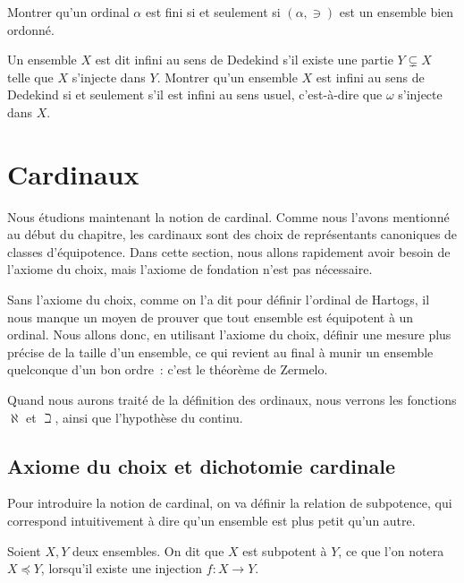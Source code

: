 \begin{exercise}
  Montrer qu'un ordinal $\alpha$ est fini si et seulement si $(\alpha,\ni)$ est
  un ensemble bien ordonné.
\end{exercise}

\begin{exercise}
  Un ensemble $X$ est dit infini au sens de Dedekind s'il existe une partie
  $Y\subsetneq X$ telle que $X$ s'injecte dans $Y$. Montrer qu'un ensemble $X$
  est infini au sens de Dedekind si et seulement s'il est infini au sens usuel,
  c'est-à-dire que $\omega$ s'injecte dans $X$.
\end{exercise}

\section{Cardinaux}

Nous étudions maintenant la notion de cardinal. Comme nous l'avons mentionné
au début du chapitre, les cardinaux sont des choix de représentants canoniques
de classes d'équipotence. Dans cette section, nous allons rapidement avoir
besoin de l'axiome du choix, mais l'axiome de fondation n'est pas nécessaire.

Sans l'axiome du choix, comme on l'a dit pour définir l'ordinal de Hartogs, il
nous manque un moyen de prouver que tout ensemble est équipotent à un ordinal.
Nous allons donc, en utilisant l'axiome du choix, définir une mesure plus
précise de la taille d'un ensemble, ce qui revient au final à munir un ensemble
quelconque d'un bon ordre~: c'est le théorème de Zermelo.

Quand nous aurons traité de la définition des ordinaux, nous verrons les
fonctions $\aleph$ et $\beth$, ainsi que l'hypothèse du continu.

\subsection{Axiome du choix et dichotomie cardinale}

Pour introduire la notion de cardinal, on va définir la relation de subpotence,
qui correspond intuitivement à dire qu'un ensemble est plus petit qu'un autre.

\begin{definition}[Subpotence]
  Soient $X,Y$ deux ensembles. On dit que $X$ est subpotent à $Y$, ce que l'on
  notera $X\preceq Y$, lorsqu'il existe une injection $f : X \to Y$.
\end{definition}


